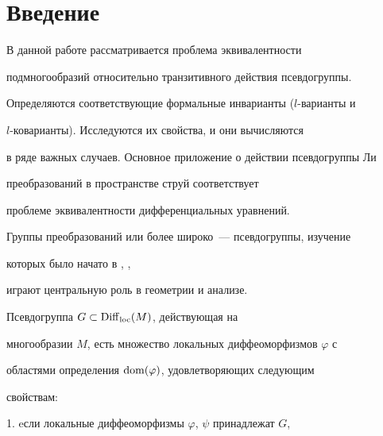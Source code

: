 \maketitle


\label{begin}











\section*{Введение}\label{sec0}








В данной работе рассматривается проблема эквивалентности


подмногообразий относительно транзитивного действия псевдогруппы.


Определяются соответствующие формальные инварианты ($l$-варианты и


$l$-коварианты). Исследуются их свойства,  и они вычисляются


в ряде важных случаев. Основное приложение о действии псевдогруппы Ли


преобразований в пространстве струй соответствует


проблеме эквивалентности дифференциальных уравнений.








Группы преобразований или более широко~--- псевдогруппы, изучение


которых было начато в \cite{Lie}, \cite{C},


играют центральную роль в геометрии и анализе.





Псевдогруппа $G \subset \operatorname{Diff}_{\operatorname{loc}}(M)$, действующая на


многообразии $M$, есть множество локальных диффеоморфизмов $\varphi$ с


областями определения $\operatorname{dom}(\varphi)$, удовлетворяющих следующим


свойствам:





1. eсли локальные диффеоморфизмы $\varphi$, $\psi$ принадлежат $G$,


